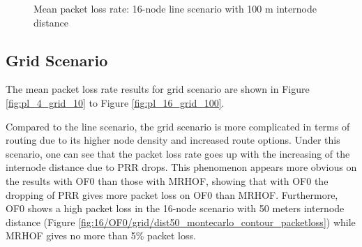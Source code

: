 \begin{figure}[p]
  \centering
    \leavevmode
  \caption{Mean packet loss rate: 16-node line scenario with 100 m internode distance}
  \label{fig:pl_16_line_100}
   \vspace{-20pt}
\end{figure}

\clearpage
\subsection{Grid Scenario}
\label{pl:grid}
The mean packet loss rate results for grid scenario are shown in Figure \ref{fig:pl_4_grid_10} to Figure \ref{fig:pl_16_grid_100}.

Compared to the line scenario, the grid scenario is more complicated in terms of routing due to its higher node density and increased route options.  Under this scenario, one can see that the packet loss rate goes up with the increasing of the internode distance due to PRR drops. This phenomenon appears more obvious on the results with OF0 than those with MRHOF, showing that with OF0 the dropping of PRR gives more packet loss on OF0 than MRHOF. Furthermore, OF0 shows a high packet loss in the 16-node scenario with 50 meters internode distance (Figure \ref{fig:16/OF0/grid/dist50_montecarlo_contour_packetloss}) while MRHOF gives no more than 5\% packet loss.

